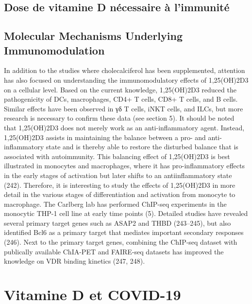 \documentclass[
  a4paper,
  DIV=11,
  numbers=noendperiod,
  listof=totoc]{scrreprt}
\begin{document}
\hypertarget{dose-de-vitamine-d-nuxe9cessaire-uxe0-limmunituxe9}{%
\section{Dose de vitamine D nécessaire à
l'immunité}\label{dose-de-vitamine-d-nuxe9cessaire-uxe0-limmunituxe9}}

\textcite{Hewison.2007}

\hypertarget{molecular-mechanisms-underlying-immunomodulation}{%
\section{Molecular Mechanisms Underlying
Immunomodulation}\label{molecular-mechanisms-underlying-immunomodulation}}

\textcite{Dankers.2017}

In addition to the studies where cholecalciferol has been supplemented,
attention has also focused on understanding the immunomodulatory effects
of 1,25(OH)2D3 on a cellular level. Based on the current knowledge,
1,25(OH)2D3 reduced the pathogenicity of DCs, macrophages, CD4+ T cells,
CD8+ T cells, and B cells. Similar effects have been observed in γδ T
cells, iNKT cells, and ILCs, but more research is necessary to confirm
these data (see section 5). It should be noted that 1,25(OH)2D3 does not
merely work as an anti-inflammatory agent. Instead, 1,25(OH)2D3 assists
in maintaining the balance between a pro- and anti-inflammatory state
and is thereby able to restore the disturbed balance that is associated
with autoimmunity. This balancing effect of 1,25(OH)2D3 is best
illustrated in monocytes and macrophages, where it has pro-inflammatory
effects in the early stages of activation but later shifts to an
antiinflammatory state (242). Therefore, it is interesting to study the
effects of 1,25(OH)2D3 in more detail in the various stages of
differentiation and activation from monocyte to macrophage. The Carlberg
lab has performed ChIP-seq experiments in the monocytic THP-1 cell line
at early time points (5). Detailed studies have revealed several primary
target genes such as ASAP2 and THBD (243--245), but also identified Bcl6
as a primary target that mediates important secondary responses (246).
Next to the primary target genes, combining the ChIP-seq dataset with
publically available ChIA-PET and FAIRE-seq datasets has improved the
knowledge on VDR binding kinetics (247, 248).

\newpage{}

\hypertarget{vitamine-d-et-covid-19}{%
\chapter{Vitamine D et COVID-19}\label{vitamine-d-et-covid-19}}
\end{document}
